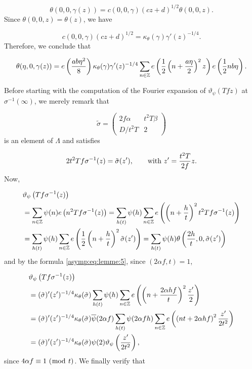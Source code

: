 \documentclass[leqno,10pt]{amsart}
\theoremstyle{plain}
\numberwithin{equation}{section}
\theoremstyle{definition}
\theoremstyle{remark}
\begin{document}
\begin{equation*}
\theta(0,0,\gamma(z)) = c(0,0,\gamma) (cz+d)^{1/2} \theta(0,0,z).
\end{equation*}
Since $\theta(0,0,z)=\theta(z)$, we have

\begin{equation*}
c(0,0,\gamma) (cz+d)^{1/2} = \kappa_\theta (\gamma) \gamma'(z)^{-1/4}.
\end{equation*}
Therefore, we conclude that

\begin{equation}\label{asymp:eq:lemme:5}
\theta(\eta,0,\gamma(z)) = e\left(\frac{ab\eta^2}{8}\right) \kappa_\theta (\gamma) \gamma'(z)^{-1/4} \sum_{n \in \mathbb{Z}}e\left(\frac{1}{2}\left(n+\frac{a\eta}{2}\right)^2 z\right) e\left(\frac{1}{2}nb\eta\right).
\end{equation}

Before starting with the computation of the Fourier expansion of $\vartheta_\psi(Tf z)$ at $\sigma^{-1}(\infty)$, we merely remark that

\begin{equation*}
\tilde{\sigma} = \begin{pmatrix}  2f\alpha &  t^2 T\beta \\ D/t^2 T & 2\end{pmatrix}
\end{equation*}
is an element of $\Lambda$ and satisfies

\begin{equation*}
2 t^2 Tf \sigma^{-1}(z) = \tilde{\sigma} (z'), \qquad \textnormal{with }  z'=\frac{t^2 T }{2 f} z .
\end{equation*}
Now, 

\begin{align*}
&\vartheta_\psi \left(Tf \sigma^{-1}(z)\right)\\
&= \sum_{n\in\mathbb{Z}} \psi(n) e\left(n^2 Tf \sigma^{-1}(z)\right) 
= \sum_{h  (t)} \psi (h) \sum_{n \in \mathbb{Z}} e\left( \left(n + \frac{h}{t}\right)^2 t^2 Tf \sigma^{-1}(z)\right)\\
&= \sum_{h (t)} \psi (h) \sum_{n \in \mathbb{Z}} e\left( \frac{1}{2}\left(n + \frac{h}{t}\right)^2  \tilde{\sigma}(z')\right)
= \sum_{h (t)} \psi (h) \theta\left(\frac{2h}{t}, 0, \tilde{\sigma}(z')\right)
\end{align*}
and by the formula \eqref{asymp:eq:lemme:5}, since $(2\alpha f,t)=1$, 

\begin{align*}
&\vartheta_\psi \left(Tf \sigma^{-1}(z)\right)\\
&= (\tilde{\sigma})' (z')^{-1/4} \kappa_\theta(\tilde{\sigma}) \sum_{h (t)} \psi (h) \sum_{n \in \mathbb{Z}}  e\left(\left(n+ \frac{2  \alpha h f }{t}\right)^2 \frac{z'}{2} \right) \\
&= (\tilde{\sigma})' (z')^{-1/4} \kappa_\theta(\tilde{\sigma}) \overline{\psi}(2\alpha f) \sum_{h (t)} \psi (2\alpha fh) \sum_{n \in \mathbb{Z}} e\left(\left(nt+ 2 \alpha h f\right)^2 \frac{z'}{2t^2} \right) \\
&= (\tilde{\sigma})' (z')^{-1/4} \kappa_\theta(\tilde{\sigma}) \psi(2) \vartheta_\psi \left(\frac{z'}{2t^2}\right),
\end{align*}
since $4\alpha f \equiv 1 \ (\bmod\  t)$.
We finally verify that
\end{document}
